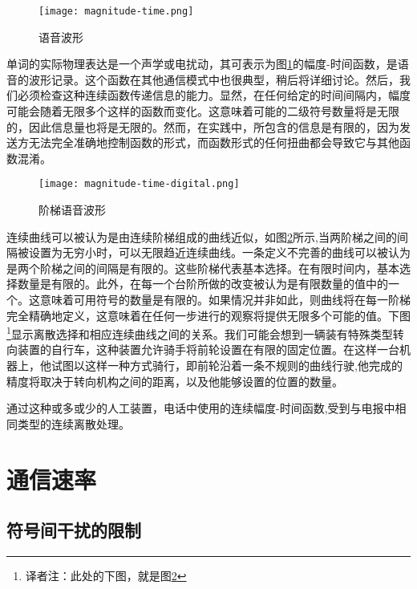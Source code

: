 \documentclass{hfutpaper}
\begin{document}
\begin{figure}[htp]%
	\centering  %
	\texttt{[image: magnitude-time.png]}  %
	\caption{语音波形}  %
	\label{fig2}
\end{figure}

单词的实际物理表达是一个声学或电扰动，其可表示为图\ref{fig2}的幅度-时间函数，是语音的波形记录。这个函数在其他通信模式中也很典型，稍后将详细讨论。然后，我们必须检查这种连续函数传递信息的能力。显然，在任何给定的时间间隔内，幅度可能会随着无限多个这样的函数而变化。这意味着可能的二级符号数量将是无限的，因此信息量也将是无限的。然而，在实践中，所包含的信息是有限的，因为发送方无法完全准确地控制函数的形式，而函数形式的任何扭曲都会导致它与其他函数混淆。\par

\begin{figure}[htp]%
	\centering  %
	\texttt{[image: magnitude-time-digital.png]}  %
	\caption{阶梯语音波形}  %
	\label{fig3}
\end{figure}

连续曲线可以被认为是由连续阶梯组成的曲线近似，如图\ref{fig3}所示,当两阶梯之间的间隔被设置为无穷小时，可以无限趋近连续曲线。一条定义不完善的曲线可以被认为是两个阶梯之间的间隔是有限的。这些阶梯代表基本选择。在有限时间内，基本选择数量是有限的。此外，在每一个台阶所做的改变被认为是有限数量的值中的一个。这意味着可用符号的数量是有限的。如果情况并非如此，则曲线将在每一阶梯完全精确地定义，这意味着在任何一步进行的观察将提供无限多个可能的值。下图\footnote{译者注：此处的下图，就是图\ref{fig3}}显示离散选择和相应连续曲线之间的关系。我们可能会想到一辆装有特殊类型转向装置的自行车，这种装置允许骑手将前轮设置在有限的固定位置。在这样一台机器上，他试图以这样一种方式骑行，即前轮沿着一条不规则的曲线行驶,他完成的精度将取决于转向机构之间的距离，以及他能够设置的位置的数量。\par

通过这种或多或少的人工装置，电话中使用的连续幅度-时间函数,受到与电报中相同类型的连续离散处理。\par

\section{通信速率}

\subsection{符号间干扰的限制}
\end{document}
